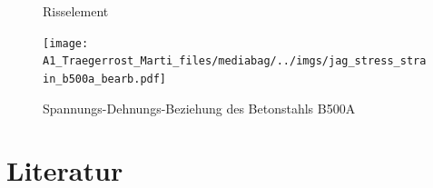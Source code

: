 \documentclass[
  11pt,
  letterpaper,
]{scrreprt}
\begin{document}
\begin{figure}[H]


\caption{\label{fig-jag_risselement}Risselement}

\end{figure}%

\begin{figure}[H]

{\centering \texttt{[image: A1\_Traegerrost\_Marti\_files/mediabag/../imgs/jag\_stress\_strain\_b500a\_bearb.pdf]}

}

\caption{Spannungs-Dehnungs-Beziehung des Betonstahls B500A}

\end{figure}%


\chapter*{Literatur}\label{literatur}

\end{document}
